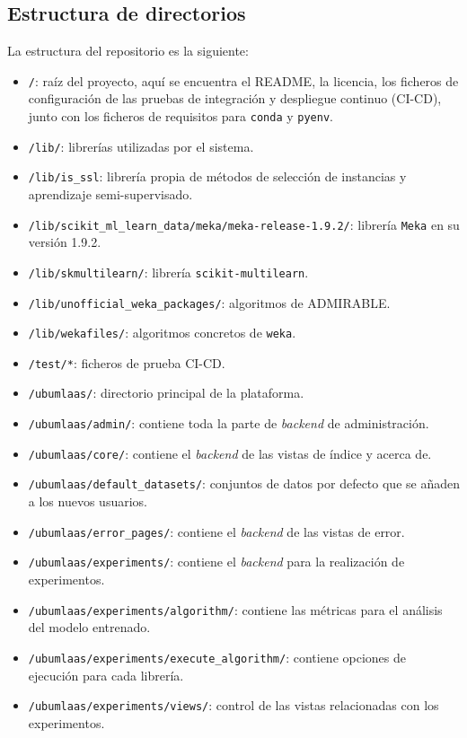 \subsection{Estructura de directorios}
La estructura del repositorio es la siguiente:
\begin{itemize}
\tightlist
\item \texttt{/}: raíz del proyecto, aquí se encuentra el README, la licencia, los ficheros de configuración de las pruebas de integración y despliegue continuo (CI-CD), junto con los ficheros de requisitos para \texttt{conda} y \texttt{pyenv}. 
\item \texttt{/lib/}: librerías utilizadas por el sistema.
\item \texttt{/lib/is\_ssl}: librería propia de métodos de selección de instancias y aprendizaje semi-supervisado.
\item \texttt{/lib/scikit\_ml\_learn\_data/meka/meka-release-1.9.2/}: librería \texttt{Meka} en su versión 1.9.2.
\item \texttt{/lib/skmultilearn/}: librería \texttt{scikit-multilearn}.
\item \texttt{/lib/unofficial\_weka\_packages/}: algoritmos de ADMIRABLE.
\item \texttt{/lib/wekafiles/}: algoritmos concretos de \texttt{weka}.
\item \texttt{/test/*}: ficheros de prueba CI-CD.
\item \texttt{/ubumlaas/}: directorio principal de la plataforma.
\item \texttt{/ubumlaas/admin/}: contiene toda la parte de \textit{backend} de administración.
\item \texttt{/ubumlaas/core/}: contiene el \textit{backend} de las vistas de índice y acerca de.
\item \texttt{/ubumlaas/default\_datasets/}: conjuntos de datos por defecto que se añaden a los nuevos usuarios.
\item \texttt{/ubumlaas/error\_pages/}: contiene el \textit{backend} de las vistas de error.
\item \texttt{/ubumlaas/experiments/}: contiene el \textit{backend} para la realización de experimentos.
\item \texttt{/ubumlaas/experiments/algorithm/}: contiene las métricas para el análisis del modelo entrenado.
\item \texttt{/ubumlaas/experiments/execute\_algorithm/}: contiene opciones de ejecución para cada librería.
\item \texttt{/ubumlaas/experiments/views/}: control de las vistas relacionadas con los experimentos.

\end{itemize}
